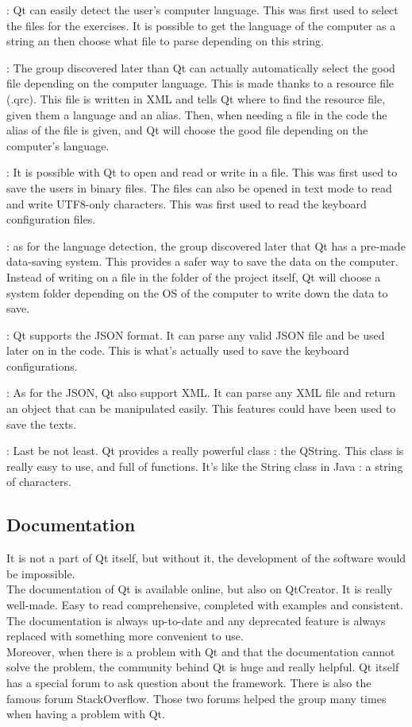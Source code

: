 \begin{description}[align=left]
	\item[Language detection] : Qt can easily detect the user's computer language. This was first used to select the files for the exercises. It is possible to get the language of the computer as a string an then choose what file to parse depending on this string.
	\item[Resources files] : The group discovered later than Qt can actually automatically select the good file depending on the computer language. This is made thanks to a resource file (.qrc). This file is written in XML and tells Qt where to find the resource file, given them a language and an alias. Then, when needing a file in the code the alias of the file is given, and Qt will choose the good file depending on the computer's language.
	\item[DataStream] : It is possible with Qt to open and read or write in a file. This 	was first used to save the users in binary files. The files can also be opened in text mode to read and write UTF8-only characters. This was first used to read the keyboard configuration files.
	\item[QSettings] : as for the language detection, the group discovered later that Qt has a pre-made data-saving system. This provides a safer way to save the data on the computer. Instead of writing on a file in the folder of the project itself, Qt will choose a system folder depending on the OS of the computer to write down the data to save.
	\item[Json] : Qt supports the JSON format. It can parse any valid JSON file and be used later on in the code. This is what's actually used to save the keyboard configurations. 
	\item[XML] : As for the JSON, Qt also support XML. It can parse any XML file and return an object that can be manipulated easily. This features could have been used to save the texts.
	\item[QString] : Last be not least. Qt provides a really powerful class : the QString. This class is really easy to use, and full of functions. It's like the String class in Java : a string of characters.
\end{description}

\subsection{Documentation}
It is not a part of Qt itself, but without it, the development of the software would be impossible.\\
The documentation of Qt is available online, but also on QtCreator. It is really well-made. Easy to read comprehensive, completed with examples and consistent. The documentation is always up-to-date and any deprecated feature is always replaced with something more convenient to use.\\
Moreover, when there is a problem with Qt and that the documentation cannot solve the problem, the community behind Qt is huge and really helpful. Qt itself has a special forum to ask question about the framework. There is also the famous forum StackOverflow. Those two forums helped the group many times when having a problem with Qt.

